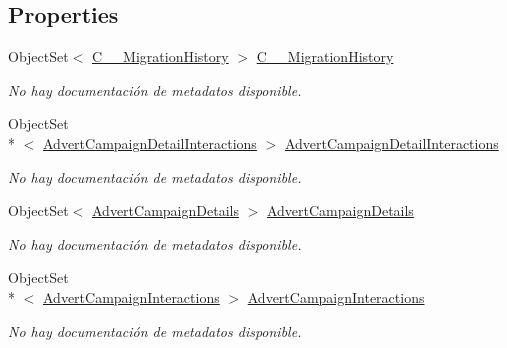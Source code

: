 \subsection*{Properties}
\begin{DoxyCompactItemize}
\item 
Object\-Set$<$ \hyperlink{class_game_memory_1_1_c_____migration_history}{C\-\_\-\-\_\-\-Migration\-History} $>$ \hyperlink{class_game_memory_1_1_o_m_k_t_d_b_entities_adba9b579fda9a3066cadb2bc29160848}{C\-\_\-\-\_\-\-Migration\-History}
\begin{DoxyCompactList}\small\item\em No hay documentación de metadatos disponible. \end{DoxyCompactList}\item 
Object\-Set\\*
$<$ \hyperlink{class_game_memory_1_1_advert_campaign_detail_interactions}{Advert\-Campaign\-Detail\-Interactions} $>$ \hyperlink{class_game_memory_1_1_o_m_k_t_d_b_entities_a4e2a832b8278305d10261301f9bcad39}{Advert\-Campaign\-Detail\-Interactions}
\begin{DoxyCompactList}\small\item\em No hay documentación de metadatos disponible. \end{DoxyCompactList}\item 
Object\-Set$<$ \hyperlink{class_game_memory_1_1_advert_campaign_details}{Advert\-Campaign\-Details} $>$ \hyperlink{class_game_memory_1_1_o_m_k_t_d_b_entities_a0ad54bc426e92a5a9d6034d017f007bc}{Advert\-Campaign\-Details}
\begin{DoxyCompactList}\small\item\em No hay documentación de metadatos disponible. \end{DoxyCompactList}\item 
Object\-Set\\*
$<$ \hyperlink{class_game_memory_1_1_advert_campaign_interactions}{Advert\-Campaign\-Interactions} $>$ \hyperlink{class_game_memory_1_1_o_m_k_t_d_b_entities_a4eb106967b73c6bfbe86b6f91a008829}{Advert\-Campaign\-Interactions}
\begin{DoxyCompactList}\small\item\em No hay documentación de metadatos disponible. \end{DoxyCompactList}\item 

\end{DoxyCompactItemize}
